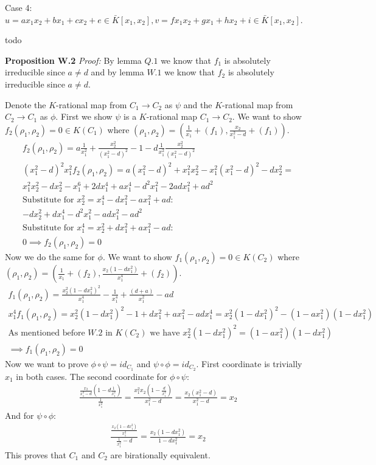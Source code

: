 \documentclass[12pt, a4paper]{article}
\begin{document}
Case 4: $u = ax_1x_2 + bx_1 + cx_2 + e \in \bar{K}[x_1,x_2], v = fx_1x_2+gx_1+hx_2+i \in \bar{K}[x_1,x_2]$. 

todo

\textbf{Proposition W.2} \textit{Proof:}
By lemma $Q.1$ we know that $f_1$ is absolutely irreducible since $a\neq d$ and by lemma $W.1$ we know that $f_2$ is absolutely irreducible since $a \neq d$. 

Denote the $K$-rational map from $C_1 \rightarrow C_2$ as $\psi$ and the $K$-rational map from $C_2 \rightarrow C_1$ as $\phi$. First we show $\psi$ is a $K$-rational map $C_1 \rightarrow C_2$. We want to show $f_2(\rho_1, \rho_2) = 0 \in K(C_1)$ where $(\rho_1, \rho_2) = \left( \frac{1}{x_1} + (f_1), \frac{x_2}{x_1^2-d} + (f_1) \right)$.
\begin{gather*}
f_2(\rho_1, \rho_2) = a\frac{1}{x_1^2} + \frac{x_2^2}{(x_1^2-d)^2} - 1 -d\frac{1}{x_1^2}\frac{x_2^2}{(x_1^2-d)^2}\\
(x_1^2-d)^2x_1^2f_2(\rho_1, \rho_2) = a(x_1^2-d)^2+x_1^2x_2^2-x_1^2(x_1^2-d)^2-dx_2^2 = \\
x_1^2x_2^2-dx_2^2-x_1^6+2dx_1^4+ax_1^4-d^2x_1^2-2adx_1^2+ad^2\\
\text{Substitute for $x_2^2 = x_1^4-dx_1^2-ax_1^2+ad$:}\\
-dx_2^2+dx_1^4-d^2x_1^2-adx_1^2-ad^2\\
\text{Substitute for $x_1^4 = x_2^2+dx_1^2+ax_1^2-ad$:}\\
0 \implies f_2(\rho_1, \rho_2) = 0
\end{gather*}
Now we do the same for $\phi$. We want to show $f_1(\rho_1, \rho_2) = 0 \in K(C_2)$ where $(\rho_1, \rho_2) = \left( \frac{1}{x_1} + (f_2), \frac{x_2(1-dx_1^2)}{x_1^4} + (f_2) \right)$.
\begin{gather*}
f_1(\rho_1, \rho_2) = \frac{x_2^2(1-dx_1^2)^2}{x_1^4} - \frac{1}{x_1^4} + \frac{(d+a)}{x_1^2}-ad\\
x_1^4f_1(\rho_1, \rho_2) = x_2^2(1-dx_1^2)^2-1+dx_1^2+ax_1^2-adx_1^4 = x_2^2(1-dx_1^2)^2 - (1-ax_1^2)(1-dx_1^2)\\
\text{As mentioned before $W.2$ in $K(C_2)$ we have $x_2^2(1-dx_1^2)^2 = (1-ax_1^2)(1-dx_1^2)$}\\
\implies f_1(\rho_1, \rho_2) = 0
\end{gather*}
Now we want to prove $\phi \circ \psi = id_{C_1}$ and $\psi \circ \phi = id_{C_2}$. First coordinate is trivially $x_1$ in both cases. The second coordinate for $\phi \circ \psi$:
\begin{gather*}
\frac{\frac{x_2}{x_1^2-d}\left(1- d\frac{1}{x_1^2} \right)}{\frac{1}{x_1^2}} = \frac{x_1^2x_2(1-\frac{d}{x_1^2})}{x_1^2-d} = \frac{x_2(x_1^2-d)}{x_1^2-d} = x_2
\end{gather*}
And for $\psi \circ \phi$:
\begin{gather*}
\frac{\frac{x_2(1-dx_1^2)}{x_1^2}}{\frac{1}{x_1^2}-d} = \frac{x_2(1-dx_1^2)}{1-dx_1^2} = x_2
\end{gather*}
This proves that $C_1$ and $C_2$ are birationally equivalent. 
\end{document}
